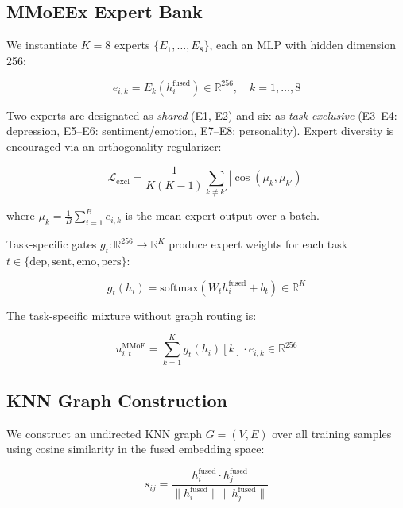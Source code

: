 \documentclass[12pt,oneside]{book}
\begin{document}
\subsection{MMoEEx Expert Bank}

We instantiate $K=8$ experts $\{E_1, \ldots, E_8\}$, each an MLP with hidden dimension 256:

\begin{equation}
    e_{i,k} = E_k(h_i^{\text{fused}}) \in \mathbb{R}^{256}, \quad k=1,\ldots,8
\end{equation}

Two experts are designated as \emph{shared} (E1, E2) and six as \emph{task-exclusive} (E3--E4: depression, E5--E6: sentiment/emotion, E7--E8: personality). Expert diversity is encouraged via an orthogonality regularizer:

\begin{equation}
    \mathcal{L}_{\text{excl}} = \frac{1}{K(K-1)} \sum_{k \neq k'} |\cos(\mu_k, \mu_{k'})|
\end{equation}

where $\mu_k = \frac{1}{B} \sum_{i=1}^B e_{i,k}$ is the mean expert output over a batch.

Task-specific gates $g_t: \mathbb{R}^{256} \to \mathbb{R}^K$ produce expert weights for each task $t \in \{\text{dep}, \text{sent}, \text{emo}, \text{pers}\}$:

\begin{equation}
    g_t(h_i) = \text{softmax}(W_t h_i^{\text{fused}} + b_t) \in \mathbb{R}^K
\end{equation}

The task-specific mixture without graph routing is:

\begin{equation}
    u_{i,t}^{\text{MMoE}} = \sum_{k=1}^K g_t(h_i)[k] \cdot e_{i,k} \in \mathbb{R}^{256}
\end{equation}

\subsection{KNN Graph Construction}

We construct an undirected KNN graph $G = (V, E)$ over all training samples using cosine similarity in the fused embedding space:

\begin{equation}
    s_{ij} = \frac{h_i^{\text{fused}} \cdot h_j^{\text{fused}}}{\|h_i^{\text{fused}}\| \|h_j^{\text{fused}}\|}
\end{equation}
\end{document}
